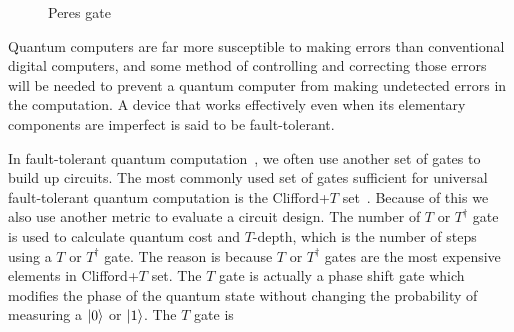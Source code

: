 \documentclass[%
reprint,
 amsmath,amssymb,
 aps,
]{revtex4-1}
\begin{document}
\begin{figure}[h]
\centering
{}\hspace{2em}
\caption{Peres gate}
\label{fig:Peres gate}
\end{figure}

Quantum computers are far more susceptible to making errors than conventional digital computers, and some method of controlling and correcting those errors will be needed to prevent a quantum computer from making undetected errors in the computation. A device that works effectively even when its elementary components are imperfect is said to be fault-tolerant. 

In fault-tolerant quantum computation~\cite{quantum-fault-tolerant}, we often use another set of gates to build up circuits. The most commonly used set of gates sufficient for universal fault-tolerant quantum computation is the Clifford+$T$ set~\cite{clifford}. Because of this we also use another metric to evaluate a circuit design. The number of $T$ or $T^\dag$ gate is used to calculate quantum cost and $T$-depth, which is the number of steps using a $T$ or $T^\dag$ gate. The reason is because $T$ or $T^\dag$ gates are the most expensive elements in Clifford+$T$ set. The $T$ gate is actually a phase shift gate which modifies the phase of the quantum state without changing the probability of measuring a ${\left\vert{0}\right\rangle}$ or ${\left\vert{1}\right\rangle}$. The $T$ gate is
\end{document}
